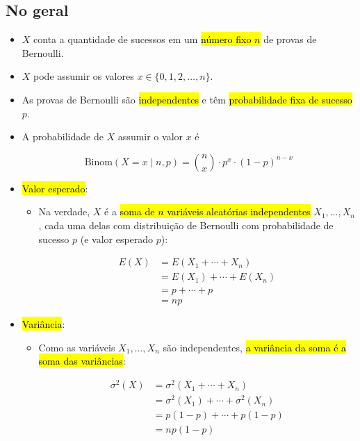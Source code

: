 \documentclass[
  11pt]{report}
\begin{document}
\hypertarget{no-geral-4}{%
\subsection{No geral}\label{no-geral-4}}

\begin{itemize}
\item
  $X$ conta a quantidade de sucessos em um {\hl{número fixo $n$}} de provas de Bernoulli.
\item
  $X$ pode assumir os valores $x \in \{ 0, 1, 2, \ldots, n\}$.
\item
  As provas de Bernoulli são {\hl{independentes}} e têm {\hl{probabilidade fixa de sucesso}} $p$.
\item
  A probabilidade de $X$ assumir o valor $x$ é

  \[
  \text{Binom}(X = x \mid n, p) = {n \choose x} \cdot p^x \cdot (1 - p)^{n - x}
  \]
\item
  {\hl{Valor esperado}}:

  \begin{itemize}
  \item
    Na verdade, $X$ é a {\hl{soma de $n$ variáveis aleatórias independentes}} $X_1, \ldots, X_n$, cada uma delas com distribuição de Bernoulli com probabilidade de sucesso $p$ (e valor esperado $p$):

    \[
      \begin{aligned}
        E(X) &= E(X_1 + \cdots + X_n) \\ 
             &= E(X_1) + \cdots + E(X_n) \\
             &= p + \cdots + p \\
             &= np
      \end{aligned}
    \]
  \end{itemize}
\item
  {\hl{Variância}}:

  \begin{itemize}
  \item
    Como as variáveis $X_1, \ldots, X_n$ são independentes, {\hl{a variância da soma é a soma das variâncias}}:

    \[
      \begin{aligned}
        \sigma^2(X) &= \sigma^2(X_1 + \cdots + X_n) \\ 
             &= \sigma^2(X_1) + \cdots + \sigma^2(X_n) \\
             &= p(1-p) + \cdots + p(1-p) \\
             &= np(1-p)
      \end{aligned}
    \]
  \end{itemize}
\end{itemize}
\end{document}
